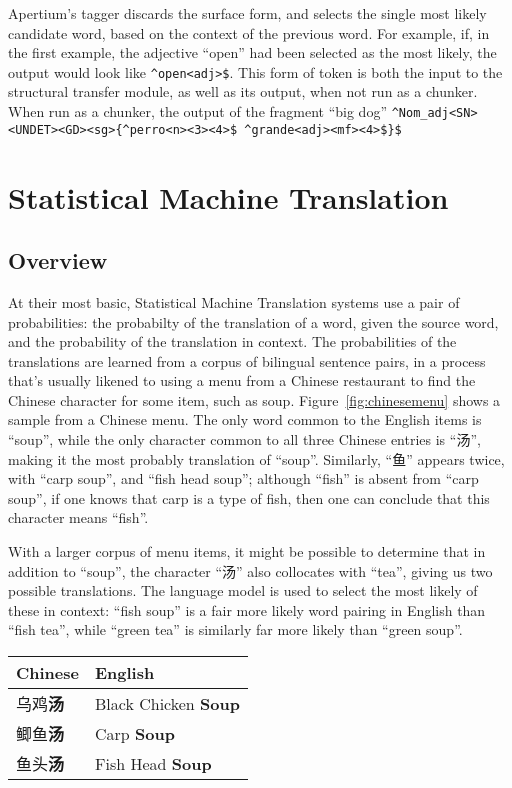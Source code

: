 Apertium's tagger discards the surface form, and selects the single most likely candidate word,
based on the context of the previous word. For example, if, in the first example, the adjective
``open'' had been selected as the most likely, the output would look like \texttt{\^{}open<adj>\$}.
This form of token is both the input to the structural transfer module, as well as its output,
when not run as a chunker. When run as a chunker, the output of the fragment ``big dog''
\texttt{\^{}Nom\_adj<SN><UNDET><GD><sg>\{\^{}perro<n><3><4>\$ \^{}grande<adj><mf><4>\$\}\$}


\section{Statistical Machine Translation}
\label{sect:bgsmt}

\subsection{Overview}

At their most basic, Statistical Machine Translation systems use a pair of probabilities: the probabilty of the translation
of a word, given the source word, and the probability of the translation in context. The probabilities of the
translations are learned from a corpus of bilingual sentence pairs, in a process that's usually likened
to using a menu from a Chinese restaurant to find the Chinese character for some item, such as soup.
Figure~\ref{fig:chinesemenu} shows a sample from a Chinese menu. The only word common to the English items
is ``soup'', while the only character common to all three Chinese entries is ``汤'', making it the most
probably translation of ``soup''. Similarly, ``鱼'' appears twice, with ``carp soup'', and ``fish head soup'';
although ``fish'' is absent from ``carp soup'', if one knows that carp is a type of fish, then one can conclude
that this character means ``fish''.

With a larger corpus of menu items, it might be possible to determine that in addition to ``soup'', the character
``汤'' also collocates with ``tea'', giving us two possible translations. The language model is used to select
the most likely of these in context: ``fish soup'' is a fair more likely word pairing in English than ``fish tea'',
while ``green tea'' is similarly far more likely than ``green soup''.

\begin{figure*}
\begin{center}
\begin{tabular}{|l|l|}
\hline
Chinese & English \\
\hline
乌鸡\textbf{汤} & Black Chicken \textbf{Soup} \\
鲫鱼\textbf{汤} & Carp \textbf{Soup} \\
鱼头\textbf{汤} & Fish Head \textbf{Soup} \\
\hline
\end{tabular}
\end{center}
\caption{Chinese menu excerpt}
\label{fig:chinesemenu}
\end{figure*}


